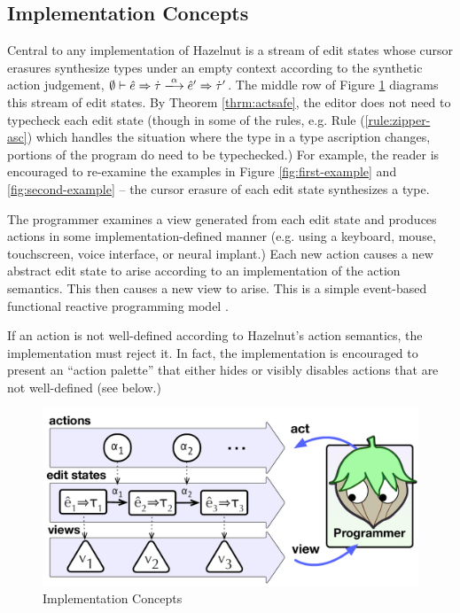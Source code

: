 \subsection{Implementation Concepts}
Central to any implementation of Hazelnut is a stream of edit states whose
cursor erasures synthesize types under an empty context according to the
synthetic action judgement,
$\performSyn{\emptyset}{\zexp}{\htau}{\alpha}{\zexp'}{\htau'}$. The middle
row of Figure \ref{fig:impl-overview} diagrams this stream of edit
states. By Theorem \ref{thrm:actsafe}, the editor does not need to
typecheck each edit state (though in some of the rules, e.g. Rule
(\ref{rule:zipper-asc}) which handles the situation where the type in a
type ascription changes, portions of the program do need to be
typechecked.) For example, the reader is encouraged to re-examine the
examples in Figure \ref{fig:first-example} and \ref{fig:second-example} --
the cursor erasure of each edit state synthesizes a type.

The programmer examines a view generated from each edit state and produces
actions in some implementation-defined manner (e.g. using a keyboard,
mouse, touchscreen, voice interface, or neural implant.) Each new action
causes a new abstract edit state to arise according to an implementation of
the action semantics. This then causes a new view to arise. This is a
simple event-based functional reactive programming model
\cite{Wan:2000:FRP:349299.349331}.

If an action is not well-defined according to Hazelnut's action semantics,
the implementation must reject it. In fact, the implementation is
encouraged to present an ``action palette'' that either hides or visibly
disables actions that are not well-defined (see below.)

\begin{figure}
\centering
\includegraphics[width=\columnwidth]{impl-overview2}
\caption{Implementation Concepts}
\label{fig:impl-overview}
\end{figure}

